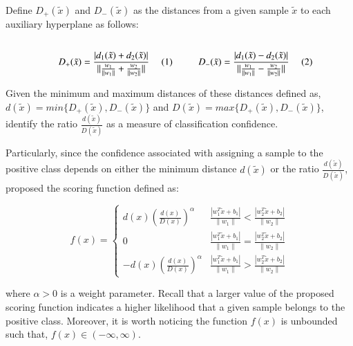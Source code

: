 \documentclass[12pt]{report} %
\begin{document}
Define $D_+(\tilde{x})$ and $D_-(\tilde{x})$ as the distances from a given sample $\tilde{x}$ to each auxiliary hyperplane as follows:

\begin{subequations}
\begin{minipage}{0.38\textwidth}
\begin{equation}
D_+(\tilde{x}) = \frac{|d_1(\tilde{x}) + d_2(\tilde{x})|}{\|\frac{w_1}{\|w_1\|} + \frac{w_2}{\|w_2\|}\|}
\end{equation}
\end{minipage}
\hspace{0.5cm}
\begin{minipage}{0.38\textwidth}
\begin{equation}
D_-(\tilde{x}) = \frac{|d_1(\tilde{x}) - d_2(\tilde{x})|}{\|\frac{w_1}{\|w_1\|} - \frac{w_2}{\|w_2\|}\|}
\end{equation}
\end{minipage}
\end{subequations}

Given the minimum and maximum distances of these distances defined as, $d(\tilde{x}) = min\{D_+(\tilde{x}), D_-(\tilde{x})\}$ and $D(\tilde{x}) = max\{D_+(\tilde{x}), D_-(\tilde{x})\}$, \cite{shao2012probabilistic} identify the ratio $\frac{d(\tilde{x})}{D(\tilde{x})}$ as a measure of classification confidence.

Particularly, since the confidence associated with assigning a sample to the positive class depends on either the minimum distance $d(\tilde{x})$ or the ratio $\frac{d(\tilde{x})}{D(\tilde{x})}$, \cite{shao2012probabilistic} proposed the scoring function defined as:

\begin{equation}
\label{eq:ptwsvm}
f(x) = \begin{cases} d(x)(\frac{d(x)}{D(x)})^{\alpha} &\frac{|w_1^T\tilde{x} + b_1|}{\|w_1\|} < \frac{|w_2^T\tilde{x} + b_2|}{\|w_2\|}  \\
0 & \frac{|w_1^T\tilde{x} + b_1|}{\|w_1\|} = \frac{|w_2^T\tilde{x} + b_2|}{\|w_2\|} \\
-d(x)(\frac{d(x)}{D(x)})^{\alpha} & \frac{|w_1^T\tilde{x} + b_1|}{\|w_1\|} > \frac{|w_2^T\tilde{x} + b_2|}{\|w_2\|}
\end{cases}
\end{equation}

where $\alpha > 0$ is a weight parameter. Recall that a larger value of the proposed scoring function indicates a higher likelihood that a given sample belongs to the positive class. Moreover, it is worth noticing the function $f(x)$ is unbounded such that, $f(x) \in (- \infty, \infty)$.
\end{document}
